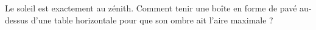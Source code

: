 Le soleil est exactement au zénith. Comment tenir une boîte en forme de pavé au-dessus d'une table horizontale pour que son ombre ait l'aire maximale ?
